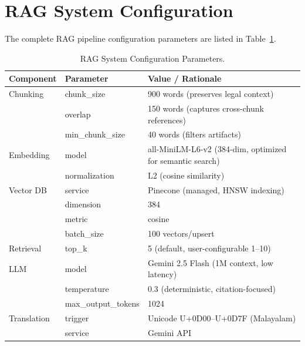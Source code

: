 \documentclass[12pt,a4paper]{report}
\begin{document}
\section{RAG System Configuration}
The complete RAG pipeline configuration parameters are listed in Table~\ref{tab:rag_config}.

\begin{table}[H]
\centering
\caption{RAG System Configuration Parameters.}
\label{tab:rag_config}
\small
\begin{tabularx}{\textwidth}{l p{4.2cm} X}
\toprule
\textbf{Component} & \textbf{Parameter} & \textbf{Value / Rationale} \\
\midrule
Chunking & chunk\_size & 900 words (preserves legal context) \\
 & overlap & 150 words (captures cross-chunk references) \\
 & min\_chunk\_size & 40 words (filters artifacts) \\
Embedding & model & all-MiniLM-L6-v2 (384-dim, optimized for semantic search) \\
 & normalization & L2 (cosine similarity) \\
Vector DB & service & Pinecone (managed, HNSW indexing) \\
 & dimension & 384 \\
 & metric & cosine \\
 & batch\_size & 100 vectors/upsert \\
Retrieval & top\_k & 5 (default, user-configurable 1–10) \\
LLM & model & Gemini 2.5 Flash (1M context, low latency) \\
 & temperature & 0.3 (deterministic, citation-focused) \\
 & max\_output\_tokens & 1024 \\
Translation & trigger & Unicode U+0D00–U+0D7F (Malayalam) \\
 & service & Gemini API \\
\bottomrule
\end{tabularx}
\end{table}
\end{document}
